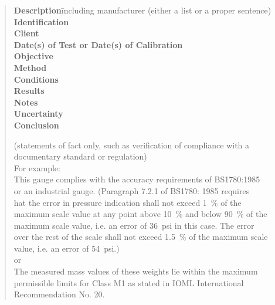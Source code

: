 \begin{quote}
\begin{tabbing}
\textbf{Description}\hspace{12mm}\=including manufacturer (either a list or a proper sentence)\\[\baselineskip]

\textbf{Identification}\mbox{}\\[\baselineskip]

\textbf{Client}\mbox{}\\[\baselineskip]

\textbf{Date(s) of Test or Date(s) of Calibration}\mbox{}\\[\baselineskip]

\textbf{Objective}\mbox{}\\[\baselineskip]

\textbf{Method}\mbox{}\\[\baselineskip]

\textbf{Conditions}\mbox{}\\[\baselineskip]

\textbf{Results}\mbox{}\\[\baselineskip]

\textbf{Notes}\mbox{}\\[\baselineskip]

\textbf{Uncertainty}\mbox{}\\[\baselineskip]


\textbf{Conclusion}\>\begin{minipage}[t]{.7\textwidth}
(statements of fact only, such as verification of compliance with a documentary standard or regulation)\\[\baselineskip]
For example:\\

This gauge complies with the accuracy requirements of BS1780:1985\\ or an industrial gauge. (Paragraph 7.2.1 of BS1780: 1985 requires\\ hat the error in pressure indication shall not exceed \SI{1}{\%} of the\\ 
maximum scale value at any point above \SI{10}{\%} and below \SI{90}{\%} of the \\
maximum scale value, i.e. an error of \SI{36}{psi} in this case. The error\\ 
over the rest of the scale shall not exceed \SI{1.5}{\%} of the maximum scale\\ 
value, i.e. an error of \SI{54}{psi}.)\\

or\\

The measured mass values of these weights lie within the maximum\\ 
permissible limits for Class M1 as stated in IOML International \\
Recommendation No. 20. 

\end{minipage}
\end{tabbing}
\end{quote}

